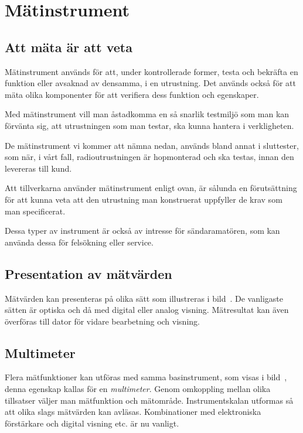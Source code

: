\section{Mätinstrument}

\subsection{Att mäta är att veta}

Mätinstrument används för att, under kontrollerade former, testa och bekräfta
en funktion eller avsaknad av densamma, i en utrustning.
Det används också för att mäta olika komponenter för att verifiera dess
funktion och egenskaper.

Med mätinstrument vill man åstadkomma en så snarlik testmiljö som man kan
förvänta sig, att utrustningen som man testar, ska kunna hantera i
verkligheten.

De mätinstrument vi kommer att nämna nedan, används bland annat i sluttester,
som när, i vårt fall, radioutrustningen är hopmonterad och ska testas, innan den
levereras till kund.

Att tillverkarna använder mätinstrument enligt ovan, är sålunda en förutsättning
för att kunna veta att den utrustning man konstruerat uppfyller de krav som man
specificerat.

Dessa typer av instrument är också av intresse för sändaramatören, som kan
använda dessa för felsökning eller service.

\subsection{Presentation av mätvärden}


Mätvärden kan presenteras på olika sätt som illustreras i
bild~.
De vanligaste sätten är optiska och då med digital eller analog visning.
Mätresultat kan även överföras till dator för vidare bearbetning och visning.

\subsection{Multimeter}

Flera mätfunktioner kan utföras med samma basinstrument, som visas i
bild~, denna egenskap kallas för en \emph{multimeter}.
Genom omkoppling mellan olika tillsatser väljer man mätfunktion och mätområde.
Instrumentskalan utformas så att olika slags mätvärden kan avläsas.
Kombinationer med elektroniska förstärkare och digital visning etc. är nu
vanligt.

